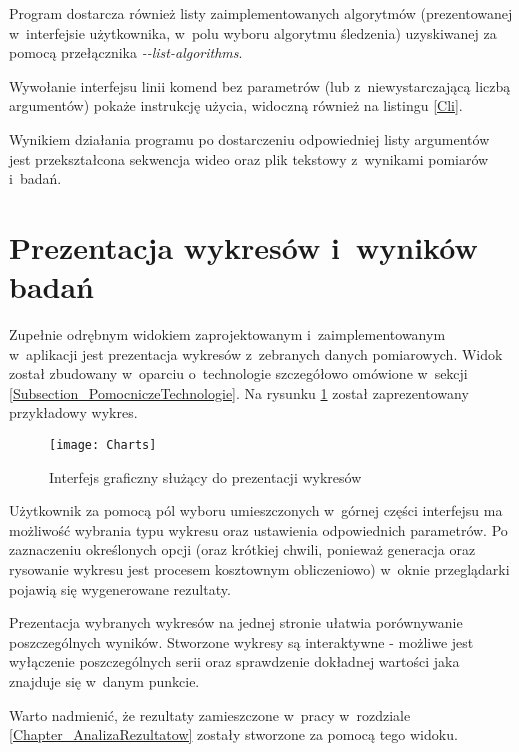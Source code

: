     Program dostarcza również listy zaimplementowanych algorytmów (prezentowanej w~interfejsie użytkownika, w~polu wyboru algorytmu śledzenia) uzyskiwanej za pomocą przełącznika \textit{-{}-list-algorithms}.

    Wywołanie interfejsu linii komend bez parametrów (lub z~niewystarczającą liczbą argumentów) pokaże instrukcję użycia, widoczną również na listingu \ref{Cli}.

    Wynikiem działania programu po dostarczeniu odpowiedniej listy argumentów jest przekształcona sekwencja wideo oraz plik tekstowy z~wynikami pomiarów i~badań.

  \section{Prezentacja wykresów i~wyników badań}

    Zupełnie odrębnym widokiem zaprojektowanym i~zaimplementowanym w~aplikacji jest prezentacja wykresów z~zebranych danych pomiarowych. Widok został zbudowany w~oparciu o~technologie szczegółowo omówione w~sekcji \ref{Subsection_PomocniczeTechnologie}. Na rysunku \ref{fig:Charts} został zaprezentowany przykładowy wykres.

    \newpage
      \begin{figure}[!ht]
        \centering
        \texttt{[image: Charts]}
        \caption[Interfejs graficzny służący do prezentacji wykresów]{Interfejs graficzny służący do prezentacji wykresów}
        \label{fig:Charts}
      \end{figure}

    Użytkownik za pomocą pól wyboru umieszczonych w~górnej części interfejsu ma możliwość wybrania typu wykresu oraz ustawienia odpowiednich parametrów. Po zaznaczeniu określonych opcji (oraz krótkiej chwili, ponieważ generacja oraz rysowanie wykresu jest procesem kosztownym obliczeniowo) w~oknie przeglądarki pojawią się wygenerowane rezultaty.

    Prezentacja wybranych wykresów na jednej stronie ułatwia porównywanie poszczególnych wyników. Stworzone wykresy są interaktywne - możliwe jest wyłączenie poszczególnych serii oraz sprawdzenie dokładnej wartości jaka znajduje się w~danym punkcie.

    Warto nadmienić, że rezultaty zamieszczone w~pracy w~rozdziale \ref{Chapter_AnalizaRezultatow} zostały stworzone za pomocą tego widoku.